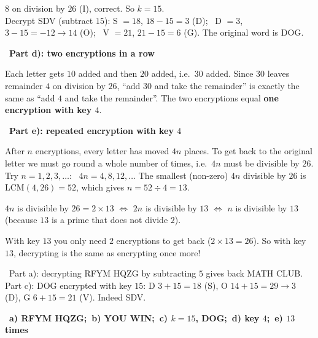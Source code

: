 \documentclass[11pt]{article}
\providecommand{\AnsWord}{Đáp số}
\newcommand{\ans}[1]{\par\smallskip{\bfseries\color{tmGreen!88!black}\AnsWord:}\ {\bfseries\color{AnsRed}#1}\par}
\newcommand{\step}[2]{\par\smallskip\noindent{\bfseries\color{tmBlue!85!black}\StepWord~#1.}\ {\bfseries #2}\par\nopagebreak}
\newcommand{\verify}[1]{\par\smallskip\noindent{\bfseries\color{tmGreen!80!black}\faCheckCircle\ \CheckWord}\ #1\par}
\def\AnsWord{Answer}
\def\StepWord{Step}
\def\CheckWord{Check:}
\begin{document}
{$8$ on division by $26$ (I), correct. So $k = 15$.\\
Decrypt \textsf{SDV} (subtract $15$): S $= 18$, $18 - 15 = 3$ (D); \ D $= 3$, $3 - 15 = -12 \to 14$ (O); \ V $= 21$, $21 - 15 = 6$ (G).
The original word is \textsf{DOG}.
\step{4}{Part d): two encryptions in a row}
Each letter gets $10$ added and then $20$ added, i.e.\ $30$ added. Since $30$ leaves remainder $4$ on division by $26$, ``add $30$ and
take the remainder'' is exactly the same as ``add $4$ and take the remainder''. The two encryptions equal \textbf{one encryption with
key $4$}.
\step{5}{Part e): repeated encryption with key $4$}
After $n$ encryptions, every letter has moved $4n$ places. To get back to the original letter we must go round a whole number of
times, i.e.\ $4n$ must be divisible by $26$. Try $n = 1, 2, 3, \dots$: \ $4n = 4, 8, 12, \dots$ The smallest (non-zero) $4n$
divisible by $26$ is $\text{LCM}(4, 26) = 52$, which gives $n = 52 \div 4 = 13$.
\begin{recallbox}$4n$ is divisible by $26 = 2\times 13$ $\Leftrightarrow$ $2n$ is divisible by $13$ $\Leftrightarrow$ $n$ is divisible
by $13$ (because $13$ is a prime that does not divide $2$).\end{recallbox}
\begin{tipbox}With key $13$ you only need $2$ encryptions to get back ($2\times 13 = 26$). So with key $13$,
decrypting is the same as encrypting once more!\end{tipbox}
\verify{Part a): decrypting \textsf{RFYM HQZG} by subtracting $5$ gives back \textsf{MATH CLUB}. Part c): \textsf{DOG} encrypted with key
$15$: D $3 + 15 = 18$ (S), O $14 + 15 = 29 \to 3$ (D), G $6 + 15 = 21$ (V). Indeed \textsf{SDV}.}
\ans{a) \textsf{RFYM HQZG};\ b) \textsf{YOU WIN};\ c) $k = 15$, \textsf{DOG};\ d) key $4$;\ e) $13$ times}
}

\end{document}
